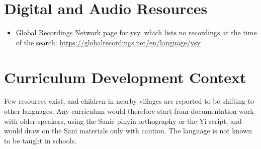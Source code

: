 \documentclass[12pt]{article}
\begin{document}
\section{Digital and Audio Resources}
\begin{itemize}
\item Global Recordings Network page for ysy, which lists no recordings at the time of the search: \url{https://globalrecordings.net/en/language/ysy}
\end{itemize}

\section{Curriculum Development Context}
Few resources exist, and children in nearby villages are reported to be shifting to other languages. Any curriculum would therefore start from documentation work with older speakers, using the Sanie pinyin orthography or the Yi script, and would draw on the Sani materials only with caution. The language is not known to be taught in schools.
\end{document}
